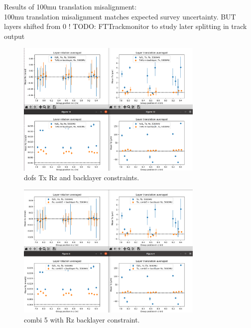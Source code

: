 Results of 100mu translation misalignment: \\
100mu translation misalignment matches expected survey uncertainty. BUT layers shifted from 0 !
TODO: FTTrackmonitor to study later splitting in track output

\begin{figure}
  \centering
  \includegraphics[width=0.8\textwidth]{plots/oct_4/TxRz_config5_backlayer.png}
  \caption{dofs Tx Rz and backlayer constraints.}
  \label{fig:oct4}
\end{figure}

\begin{figure}
  \centering
  \includegraphics[width=0.8\textwidth]{plots/oct_6/combi5_added_RZ_backlayer.png}
  \caption{combi 5 with Rz backlayer constraint.}
  \label{fig:oct6}
\end{figure}

